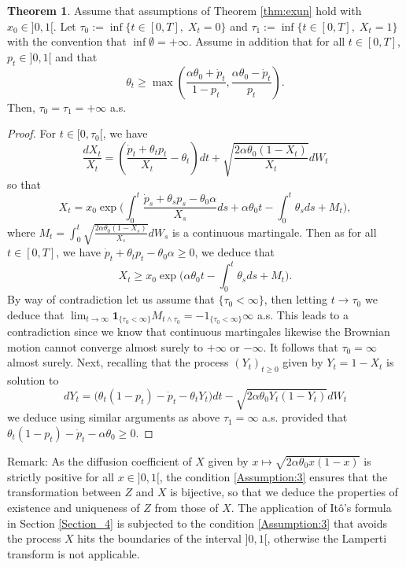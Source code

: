 \documentclass[11pt]{article}
\theoremstyle{definition}
\newtheorem{Thm}[Def]{Theorem}
\begin{document}
\begin{Thm}\label{thm:mod2}
Assume that assumptions of Theorem \ref{thm:exun} hold with $x_0\in]0,1[$.
Let $\tau_0:=\inf \{t\in[0,T],\; X_t=0\}$ and  $\tau_1:=\inf \{t\in[0,T],\; X_t=1\}$ with the convention that $\inf\emptyset=+\infty$. Assume in addition that for all $t\in[0,T]$,  $p_t\in]0,1[$ and that
\begin{equation}\label{Assumption:3}
\theta_t\geq \max\left(\frac{\alpha\theta_0+\dot p_t}{1-p_t},\frac{\alpha\theta_0-\dot p_t}{p_t}\right)\tag{B}. 
\end{equation}
 Then, $\tau_0=\tau_1=+\infty$ a.s.
\end{Thm}

\begin{proof}
For $t\in[0,\tau_0[$, we have 
$$
\frac{dX_t}{X_t}= \left(\frac{\dot p_t +\theta_t p_t}{X_t} - \theta_t\right)dt  +\sqrt{\frac{2\alpha \theta_0 (1-X_t)}{X_t}} dW_t 
$$  
so that
$$
X_t=x_0\exp\Big(\int_0^t \frac{\dot p_s +\theta_sp_s- \theta_0 \alpha}{X_s}ds+\alpha\theta_0 t-  \int_0^t\theta_sds + M_t\Big),
$$
where $M_t=\int_0^t\sqrt{\frac{2\alpha \theta_0 (1-X_s)}{X_s}} dW_s$ is a continuous martingale. Then as for all $t\in[0,T]$, we have $\dot p_t +\theta_tp_t- \theta_0 \alpha\ge0$, we deduce that
$$
X_t\ge x_0\exp\Big(\alpha\theta_0 t-  \int_0^t\theta_sds + M_t\Big).
$$
By way of contradiction let us assume that  $\{\tau_0<\infty\}$, then letting $t\to \tau_0$ we deduce that $\lim_{t\to \infty} \mathbf 1_{\{\tau_0<\infty\}}M_{t\wedge \tau_0}=\mathbf -1_{\{\tau_0<\infty\}}\infty$ a.s. This leads to a contradiction since we know that continuous martingales likewise the Brownian motion cannot converge  almost surely to $+\infty$ or $-\infty$. It follows that $\tau_0=\infty$ almost surely. Next, recalling that  the process $(Y_t)_{t\geq 0}$  given by $Y_t=1-X_t$ is solution to 
$$
dY_t= \big( \theta_t(1-p_t) -\dot p_t - \theta_tY_t  \big)dt  -\sqrt{2\alpha \theta_0 Y_t(1-Y_t)} dW_t 
$$
we deduce using similar arguments as above 
$\tau_1=\infty$ a.s. provided that $\theta_t(1-p_t) -\dot p_t -\alpha \theta_0 \ge 0$.
 \end{proof} 

Remark: As the diffusion coefficient of $X$  given by  $x \mapsto \sqrt{2 \alpha \theta_0 x(1-x)}$  is strictly positive for all $x \in  ]0,1[$, the condition \eqref{Assumption:3}  ensures that the transformation between $Z$ and $X$ is bijective, so that we deduce the properties of existence and uniqueness of $Z$ from those of $X$. The application of  It\^{o}'s formula in Section \ref{Section_4} is subjected to the condition \eqref{Assumption:3} that avoids the process $X$ hits the boundaries of the interval $ ]0,1[$, otherwise the Lamperti transform is not applicable. 



\nocite{*}
 
\printbibliography[keyword={Wind-SDE},title={References}]
\end{document}
